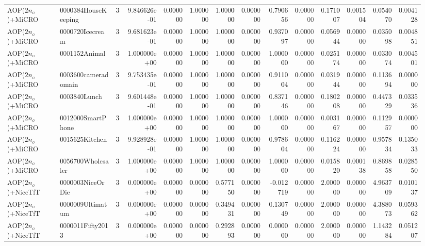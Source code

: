\begin{tabular}{llrr|r|rr|rr|rr|rrr}
       AOP($2 n_o$)+MiCRO &    0000384HouseKeeping &       3 & 9.846626e-01 & 0.000000 & 1.000000 &      1.000000 & 0.000000 &      0.790656 & 0.000000 &      0.171007 &    0.001504 &     0.054070 &    0.004128 \\
       AOP($2 n_o$)+MiCRO &        0000720Icecream &       3 & 9.681623e-01 & 0.000000 & 1.000000 &      1.000000 & 0.000000 &      0.937097 & 0.000000 &      0.056944 &    0.000000 &     0.035098 &    0.004851 \\
       AOP($2 n_o$)+MiCRO &          0001152Animal &       3 & 1.000000e+00 & 0.000000 & 1.000000 &      1.000000 & 0.000000 &      1.000000 & 0.000000 &      0.025174 &    0.000000 &     0.033074 &    0.004501 \\
       AOP($2 n_o$)+MiCRO &    0003600cameradomain &       3 & 9.753435e-01 & 0.000000 & 1.000000 &      1.000000 & 0.000000 &      0.911004 & 0.000000 &      0.031944 &    0.000000 &     0.113694 &    0.000000 \\
       AOP($2 n_o$)+MiCRO &           0003840Lunch &       3 & 9.601448e-01 & 0.000000 & 1.000000 &      1.000000 & 0.000000 &      0.837146 & 0.000000 &      0.180208 &    0.000000 &     0.447329 &    0.033536 \\
       AOP($2 n_o$)+MiCRO &      0012000SmartPhone &       3 & 1.000000e+00 & 0.000000 & 1.000000 &      1.000000 & 0.000000 &      1.000000 & 0.000000 &      0.003167 &    0.000000 &     0.112957 &    0.000000 \\
       AOP($2 n_o$)+MiCRO &         0015625Kitchen &       3 & 9.928928e-01 & 0.000000 & 1.000000 &      1.000000 & 0.000000 &      0.978604 & 0.000000 &      0.116224 &    0.000000 &     0.957834 &    0.135033 \\
       AOP($2 n_o$)+MiCRO &      0056700Wholesaler &       3 & 1.000000e+00 & 0.000000 & 1.000000 &      1.000000 & 0.000000 &      1.000000 & 0.000000 &      0.015820 &    0.000138 &     0.869858 &    0.028550 \\
     AOP($2 n_o$)+NiceTfT &       0000003NiceOrDie &       3 & 0.000000e+00 & 0.000000 & 0.000000 &      0.577150 & 0.000000 &     -0.012719 & 0.000000 &      2.000000 &    0.000000 &     4.963709 &    0.010137 \\
     AOP($2 n_o$)+NiceTfT &       0000009Ultimatum &       3 & 0.000000e+00 & 0.000000 & 0.000000 &      0.349431 & 0.000000 &      0.130749 & 0.000000 &      2.000000 &    0.000000 &     4.388073 &    0.059362 \\
     AOP($2 n_o$)+NiceTfT &       0000011Fifty2013 &       3 & 0.000000e+00 & 0.000000 & 0.000000 &      0.292893 & 0.000000 &      0.000000 & 0.000000 &      2.000000 &    0.000000 &     1.143284 &    0.051207 \\

\end{tabular}

